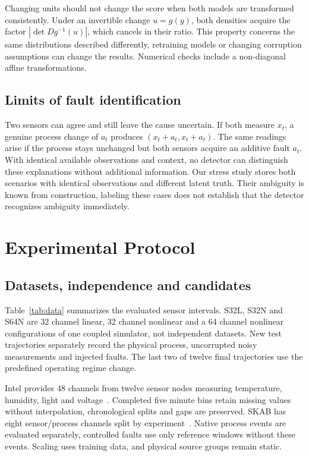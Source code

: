 \documentclass{llncs}
\newcommand{\1}{\mathbf{1}}
\begin{document}
Changing units should not change the score when both models are transformed consistently. Under an invertible change $u=g(y)$, both densities acquire the factor $|\det Dg^{-1}(u)|$, which cancels in their ratio. This property concerns the same distributions described differently, retraining models or changing corruption assumptions can change the results. Numerical checks include a non-diagonal affine transformations.

\subsection{Limits of fault identification}
Two sensors can agree and still leave the cause uncertain. If both measure $x_t$, a genuine process change of $a_t$ produces $(x_t+a_t,x_t+a_t)$. The same readings arise if the process stays unchanged but both sensors acquire an additive fault $a_t$. With identical available observations and context, no detector can distinguish these explanations without additional information. Our stress study stores both scenarios with identical observations and different latent truth. Their ambiguity is known from construction, labeling these cases does not establish that the detector recognizes ambiguity immediately.







\section{Experimental Protocol}

\subsection{Datasets, independence and candidates}
Table~\ref{tab:data} summarizes the evaluated sensor intervals. S32L, S32N and S64N are 32 channel linear, 32 channel nonlinear and a 64 channel nonlinear configurations of one coupled simulator, not independent datasets. New test trajectories separately record the physical process, uncorrupted noisy measurements and injected faults. The last two of twelve final trajectories use the predefined operating regime change.

Intel provides 48 channels from twelve sensor nodes measuring temperature, humidity, light and voltage~\cite{intel}. Completed five minute bins retain missing values without interpolation, chronological splits and gaps are preserved. SKAB has eight sensor/process channels split by experiment~\cite{skab}. Native process events are evaluated separately, controlled faults use only reference windows without these events. Scaling uses training data, and physical source groups remain static.
\end{document}
